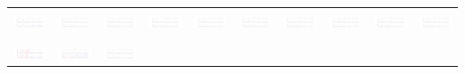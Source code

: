 \documentclass[]{article}
\begin{document}
	
\begin{table}[h]
	\centering
	\begin{tabular}{| c | c | c | c | c | c | c | c | c | c |}
		\hline
		& & & & & & & & & \\
		\includegraphics[width=0.09\linewidth]{0.00_0.00.png} &
		\includegraphics[width=0.09\linewidth]{0.00_0.10.png} &
		\includegraphics[width=0.09\linewidth]{0.00_0.20.png} &
		\includegraphics[width=0.09\linewidth]{0.00_0.30.png} &
		\includegraphics[width=0.09\linewidth]{0.00_0.40.png} &
		\includegraphics[width=0.09\linewidth]{0.00_0.50.png} &
		\includegraphics[width=0.09\linewidth]{0.00_0.60.png} &
		\includegraphics[width=0.09\linewidth]{0.00_0.70.png} &
		\includegraphics[width=0.09\linewidth]{0.00_0.80.png} &
		\includegraphics[width=0.09\linewidth]{0.00_0.90.png} \\
		& & & & & & & & & \\
		\hline
		& & & & & & & & & \\
		\includegraphics[width=0.09\linewidth]{0.10_0.00.png} &
		\includegraphics[width=0.09\linewidth]{0.10_0.10.png} &
		\includegraphics[width=0.09\linewidth]{0.10_0.20.png} &

\end{tabular}
\end{table}
\end{document}
